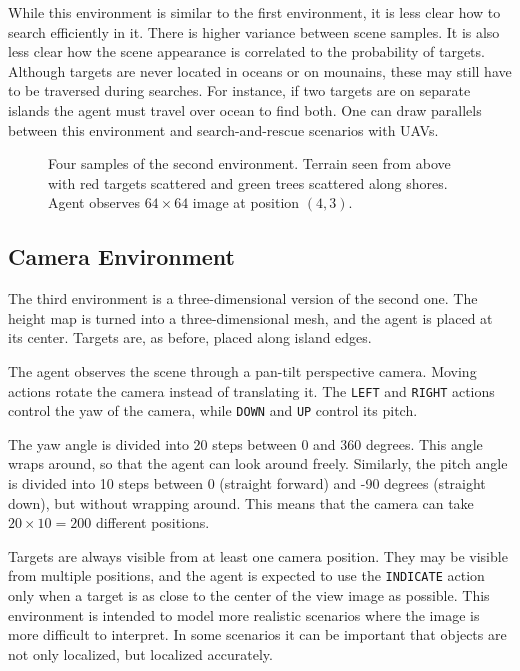 While this environment is similar to the first environment, it is less clear how to search efficiently in it.
There is higher variance between scene samples.
It is also less clear how the scene appearance is correlated to the probability of targets.
Although targets are never located in oceans or on mounains, these may still have to be traversed during searches.
For instance, if two targets are on separate islands the agent must travel over ocean to find both.
One can draw parallels between this environment and search-and-rescue scenarios with UAVs.

\begin{figure}
    \centering
    
    \caption[Terrain environment]{Four samples of the second environment. Terrain seen from above with red targets scattered and green trees scattered along shores. Agent observes \(64 \times 64\) image at position \((4, 3)\).}
    \label{fig:terrain}
\end{figure}

\subsection{Camera Environment}

The third environment is a three-dimensional version of the second one.
The height map is turned into a three-dimensional mesh, and the agent is placed at its center.
Targets are, as before, placed along island edges.

The agent observes the scene through a pan-tilt perspective camera.
Moving actions rotate the camera instead of translating it.
The \texttt{LEFT} and \texttt{RIGHT} actions control the yaw of the camera, while \texttt{DOWN} and \texttt{UP} control its pitch.

The yaw angle is divided into 20 steps between 0 and 360 degrees.
This angle wraps around, so that the agent can look around freely.
Similarly, the pitch angle is divided into 10 steps between 0 (straight forward) and -90 degrees (straight down), but without wrapping around.
This means that the camera can take \(20 \times 10 = 200\) different positions.

Targets are always visible from at least one camera position.
They may be visible from multiple positions, and the agent is expected to use the \texttt{INDICATE} action only when a target is as close to the center of the view image as possible.
This environment is intended to model more realistic scenarios where the image is more difficult to interpret.
In some scenarios it can be important that objects are not only localized, but localized accurately.

